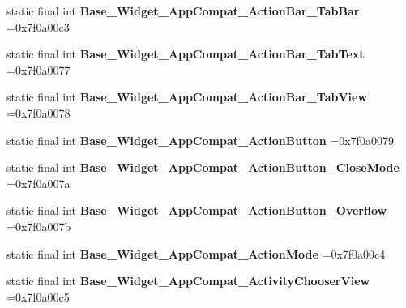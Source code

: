\begin{DoxyCompactItemize}
\mbox{\label{classproject4_1_1xaria_1_1R_1_1style_a417d87187f724a17b309e30a6f3e0343}} 
static final int {\bfseries Base\+\_\+\+Widget\+\_\+\+App\+Compat\+\_\+\+Action\+Bar\+\_\+\+Tab\+Bar} =0x7f0a00c3
\item 
\mbox{\label{classproject4_1_1xaria_1_1R_1_1style_afa60355c9e4f9296c847fd55e075fc54}} 
static final int {\bfseries Base\+\_\+\+Widget\+\_\+\+App\+Compat\+\_\+\+Action\+Bar\+\_\+\+Tab\+Text} =0x7f0a0077
\item 
\mbox{\label{classproject4_1_1xaria_1_1R_1_1style_afcb7ea163712a7aa6aed80fe88eba958}} 
static final int {\bfseries Base\+\_\+\+Widget\+\_\+\+App\+Compat\+\_\+\+Action\+Bar\+\_\+\+Tab\+View} =0x7f0a0078
\item 
\mbox{\label{classproject4_1_1xaria_1_1R_1_1style_ab706bed14cf12c2c17b496ef4822f770}} 
static final int {\bfseries Base\+\_\+\+Widget\+\_\+\+App\+Compat\+\_\+\+Action\+Button} =0x7f0a0079
\item 
\mbox{\label{classproject4_1_1xaria_1_1R_1_1style_a7473d2556331657bce3f2c501db57032}} 
static final int {\bfseries Base\+\_\+\+Widget\+\_\+\+App\+Compat\+\_\+\+Action\+Button\+\_\+\+Close\+Mode} =0x7f0a007a
\item 
\mbox{\label{classproject4_1_1xaria_1_1R_1_1style_a5df63d494152e3fa4837c58e374b1b49}} 
static final int {\bfseries Base\+\_\+\+Widget\+\_\+\+App\+Compat\+\_\+\+Action\+Button\+\_\+\+Overflow} =0x7f0a007b
\item 
\mbox{\label{classproject4_1_1xaria_1_1R_1_1style_a424f470c5454bf97e051db1415049b76}} 
static final int {\bfseries Base\+\_\+\+Widget\+\_\+\+App\+Compat\+\_\+\+Action\+Mode} =0x7f0a00c4
\item 
\mbox{\label{classproject4_1_1xaria_1_1R_1_1style_a196be7fd24db4467467d0d89b781649e}} 
static final int {\bfseries Base\+\_\+\+Widget\+\_\+\+App\+Compat\+\_\+\+Activity\+Chooser\+View} =0x7f0a00c5
\item 

\end{DoxyCompactItemize}
